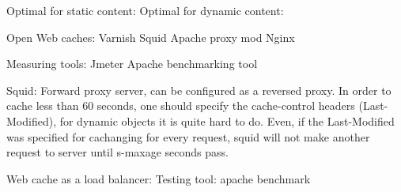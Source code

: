 Optimal for static content:
Optimal for dynamic content:


\newpage









Open Web caches:
Varnish
Squid
Apache proxy mod
Nginx

Measuring tools:
Jmeter
Apache benchmarking tool 


Squid: 
Forward proxy server, can be configured as a reversed proxy.
In order to cache less than 60 seconds, one should specify the cache-control headers (Last-Modified),
for dynamic objects it is quite hard to do. Even, if the Last-Modified was specified for cachanging for every request, squid will not make another request to server until s-maxage seconds pass.


Web cache as a load balancer:
Testing tool: apache benchmark 

